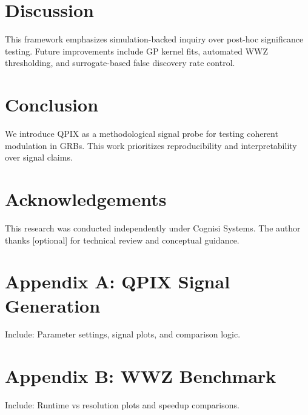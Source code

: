 \documentclass[11pt]{article}
\begin{document}
\section{Discussion}
This framework emphasizes simulation-backed inquiry over post-hoc significance testing. Future improvements include GP kernel fits, automated WWZ thresholding, and surrogate-based false discovery rate control.

\section{Conclusion}
We introduce QPIX as a methodological signal probe for testing coherent modulation in GRBs. This work prioritizes reproducibility and interpretability over signal claims.

\section*{Acknowledgements}
This research was conducted independently under Cognisi Systems. The author thanks [optional] for technical review and conceptual guidance.



\appendix
\section{Appendix A: QPIX Signal Generation}
Include: Parameter settings, signal plots, and comparison logic.

\section{Appendix B: WWZ Benchmark}
Include: Runtime vs resolution plots and speedup comparisons.
\end{document}
